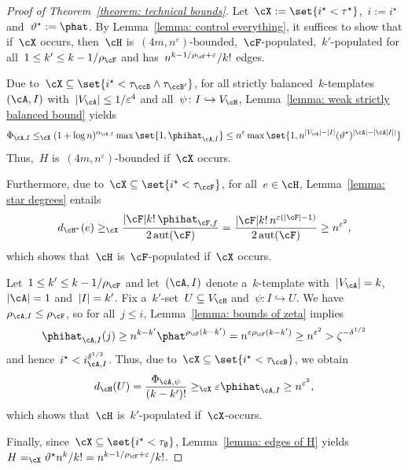 \documentclass[11pt]{amsart}
\newcommand{\eps}{\varepsilon}
\DeclarePairedDelimiter{\abs}{\lvert}{\rvert}
\newcommand{\Xleq}{\leq_{\cX}}
\newcommand{\Xeq}{=_{\cX}}
\newcommand{\Xgeq}{\geq_{\cX}}
\renewcommand{\theta}{\vartheta}
\newcommand{\injection}{\hookrightarrow}
\DeclareMathOperator{\aut}{aut}
\theoremstyle{definition}
\numberwithin{equation}{section}
\begin{document}
	\begin{proof}[Proof of Theorem~\ref{theorem: technical bounds}]
		Let~$\cX:=\set{i^\star <\tau^\star}$,~$i:=i^\star$ and~$\theta^\star:=\phat$.
		By Lemma~\ref{lemma: control everything}, it suffices to show that if~$\cX$ occurs, then~$\cH$ is~$(4m,n^\eps)$-bounded,~$\cF$-populated,~$k'$-populated for all~$1\leq k'\leq k-1/\rho_\cF$ and has~$n^{k-1/\rho_\cF+\eps}/k!$ edges.

		Due to~$\cX\subseteq\set{i^\star<\tau_{\ccB}\wedge\tau_{\ccB'}}$, for all strictly balanced~$k$-templates~$(\cA,I)$ with~$\abs{V_\cA}\leq 1/\eps^4$ and all~$\psi\colon I\injection V_\cH$, Lemma~\ref{lemma: weak strictly balanced bound} yields
		\begin{equation*}
			\Phi_{\cA,I}
			\Xleq (1+\log n)^{\alpha_{\cA,I}}\max\set{1,\phihat_{\cA,I}}
			\leq n^\eps\max\set{1,n^{\abs{V_\cA}-\abs{I}}(\theta^\star)^{\abs{\cA}-\abs{\cA[I]}}}
		\end{equation*}
		Thus,~$H$ is~$(4m,n^\eps)$-bounded if~$\cX$ occurs.
		
		Furthermore, due to~$\cX\subseteq\set{i^\star<\tau_\ccF}$, for all~$e\in\cH$, Lemma~\ref{lemma: star degrees} entails
		\begin{equation*}
			d_{\cH^*}(e)
			\Xgeq \frac{\abs{\cF}k!\,\phihat_{\cF,f}}{2\aut(\cF)}
			=\frac{\abs{\cF}k!\, n^{\eps(\abs{\cF}-1)}}{2\aut(\cF)}
			\geq n^{\eps^2},
		\end{equation*}
		which shows that~$\cH$ is~$\cF$-populated if~$\cX$ occurs.
		
		Let~$1\leq k'\leq k-1/\rho_\cF$ and let~$(\cA,I)$ denote a~$k$-template with~$\abs{V_\cA}=k$,~$\abs{\cA}=1$ and~$\abs{I}=k'$.
		Fix a~$k'$-set~$U\subseteq V_\cH$ and~$\psi\colon I\injection U$.
		We have~$\rho_{\cA,I}\leq \rho_\cF$, so for all~$j\leq i$, Lemma~\ref{lemma: bounds of zeta} implies
		\begin{equation*}
			\phihat_{\cA,I}(j)
			\geq n^{k-k'}\phat^{\rho_\cF(k-k')}
			=n^{\eps\rho_\cF(k-k')}
			\geq n^{\eps^2}
			> \zeta^{-\delta^{1/2}}
		\end{equation*}
		and hence~$i^\star< i_{\cA,I}^{\delta^{1/2}}$.
		Thus, due to~$\cX\subseteq\set{i^\star<\tau_\ccB}$, we obtain
		\begin{equation*}
			d_\cH(U)
			=\frac{\Phi_{\cA,\psi}}{(k-k')!}
			\Xgeq \eps \phihat_{\cA,I}
			\geq n^{\eps^2}, 
		\end{equation*}
		which shows that~$\cH$ is~$k'$-populated if~$\cX$-occurs.

		Finally, since~$\cX\subseteq\set{i^\star < \tau_\emptyset}$, Lemma~\ref{lemma: edges of H} yields~$H\Xeq \theta^\star n^k/k!=n^{k-1/\rho_\cF+\eps}/k!$.
	\end{proof}
\end{document}
